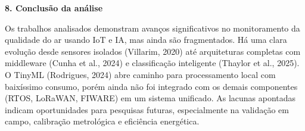 \par\noindent\textbf{8. Conclusão da análise}\par
\noindent
Os trabalhos analisados demonstram avanços significativos no monitoramento da qualidade do ar usando IoT e IA, mas ainda são 
fragmentados. Há uma clara evolução desde sensores isolados (Villarim, 2020) até arquiteturas completas 
com middleware (Cunha et al., 2024) e classificação inteligente (Thaylor et al., 2025). O TinyML (Rodrigues, 2024) 
abre caminho para processamento local com baixíssimo consumo, porém ainda não foi integrado com os demais componentes 
(RTOS, LoRaWAN, FIWARE) em um sistema unificado. As lacunas apontadas indicam oportunidades para pesquisas futuras, 
especialmente na validação em campo, calibração metrológica e eficiência energética.

\newpage


% 
